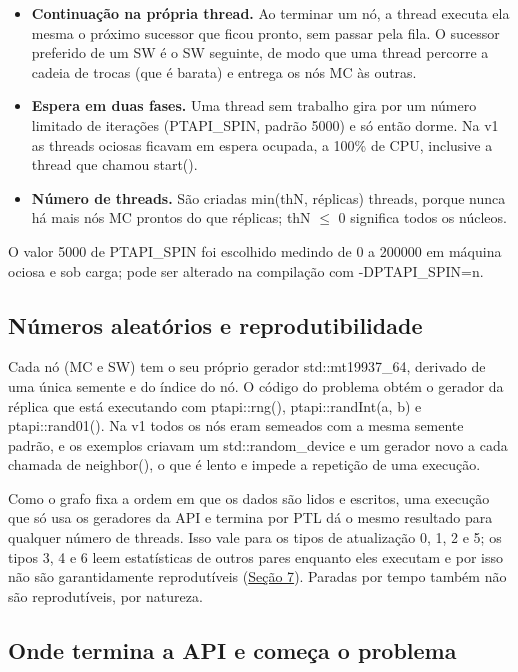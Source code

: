 \documentclass[10pt,a4paper]{article}
\newcommand{\code}[1]{{\ttfamily #1}}
\begin{document}
\begin{itemize}
\item \textbf{Continuação na própria thread.} Ao terminar um nó, a thread executa ela mesma o próximo sucessor que ficou pronto, sem passar pela fila. O sucessor preferido de um SW é o SW seguinte, de modo que uma thread percorre a cadeia de trocas (que é barata) e entrega os nós MC às outras.
\item \textbf{Espera em duas fases.} Uma thread sem trabalho gira por um número limitado de iterações (\code{PTAPI\_\allowbreak{}SPIN}, padrão 5000) e só então dorme. Na v1 as threads ociosas ficavam em espera ocupada, a 100\% de CPU, inclusive a thread que chamou \code{start()}.
\item \textbf{Número de threads.} São criadas min(\code{thN}, réplicas) threads, porque nunca há mais nós MC prontos do que réplicas; \code{thN $\le$ 0} significa todos os núcleos. \end{itemize}

O valor 5000 de \code{PTAPI\_\allowbreak{}SPIN} foi escolhido medindo de 0 a 200000 em máquina ociosa e sob carga; pode ser alterado na compilação com \code{-DPTAPI\_\allowbreak{}SPIN=n}.

\subsection{Números aleatórios e reprodutibilidade}

Cada nó (MC e SW) tem o seu próprio gerador \code{std::mt19937\_\allowbreak{}64}, derivado de uma única semente e do índice do nó. O código do problema obtém o gerador da réplica que está executando com \code{ptapi::rng()}, \code{ptapi::randInt(\allowbreak{}a, b)} e \code{ptapi::rand01()}. Na v1 todos os nós eram semeados com a mesma semente padrão, e os exemplos criavam um \code{std::random\_\allowbreak{}device} e um gerador novo a cada chamada de \code{neighbor()}, o que é lento e impede a repetição de uma execução.

Como o grafo fixa a ordem em que os dados são lidos e escritos, uma execução que só usa os geradores da API e termina por PTL dá o mesmo resultado para qualquer número de threads. Isso vale para os tipos de atualização 0, 1, 2 e 5; os tipos 3, 4 e 6 leem estatísticas de outros pares enquanto eles executam e por isso não são garantidamente reprodutíveis (\hyperref[s7]{Seção 7}). Paradas por tempo também não são reprodutíveis, por natureza.

\subsection{Onde termina a API e começa o problema}
\end{document}
